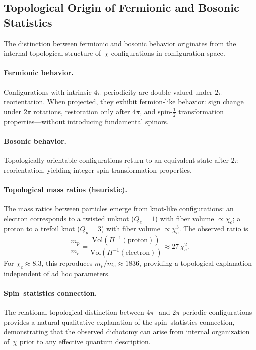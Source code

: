 \subsection{Topological Origin of Fermionic and Bosonic Statistics}
\label{app:relational_spin_statistics}

The distinction between fermionic and bosonic behavior originates from
the internal topological structure of~$\chi$ configurations in
configuration space.

\paragraph{Fermionic behavior.}
Configurations with intrinsic $4\pi$-periodicity are double-valued under
$2\pi$ reorientation.
When projected, they exhibit fermion-like behavior: sign change under
$2\pi$ rotations, restoration only after $4\pi$, and
spin-$\tfrac{1}{2}$ transformation properties---without introducing
fundamental spinors.

\paragraph{Bosonic behavior.}
Topologically orientable configurations return to an equivalent state
after $2\pi$ reorientation, yielding integer-spin transformation
properties.

\paragraph{Topological mass ratios (heuristic).}
The mass ratios between particles emerge from knot-like configurations:
an electron corresponds to a twisted unknot ($Q_e = 1$) with fiber
volume $\propto \chi_c$; a proton to a trefoil knot ($Q_p = 3$) with
fiber volume $\propto \chi_c^3$.
The observed ratio is
\[
  \frac{m_p}{m_e}
  = \frac{\mathrm{Vol}(\Pi^{-1}(\text{proton}))}
         {\mathrm{Vol}(\Pi^{-1}(\text{electron}))}
  \approx 27\,\chi_c^2.
\]
For $\chi_c \approx 8.3$, this reproduces $m_p/m_e \approx 1836$,
providing a topological explanation independent of ad hoc parameters.

\paragraph{Spin--statistics connection.}
The relational-topological distinction between $4\pi$- and
$2\pi$-periodic configurations provides a natural qualitative
explanation of the spin--statistics connection, demonstrating that the
observed dichotomy can arise from internal organization of~$\chi$ prior
to any effective quantum description.
